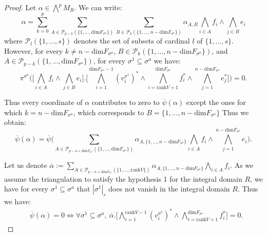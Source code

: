 \documentclass[10pt,a4paper]{amsart}
\begin{document}
\begin{proof}
    Let $\alpha \in \bigwedge^p M_R$. We can write:
    \begin{equation*}
        \alpha = \sum_{k=0}^p\sum_{A \in \mathcal{P}_{p-k}(\{1,...,\mathrm{dim}F_{\sigma^a}\})}\sum_{B \in \mathcal{P}_{k}(\{1,...,n-\mathrm{dim} F_{\sigma^a}\})}\alpha_{A,B} \bigwedge_{i \in A}f_i \wedge\bigwedge_{j\in B} e_i
    \end{equation*}
    where $\mathcal{P}_l(\{1,...,s\})$ denotes the set of subsets of cardinal $l$ of $\{1,...,s\}$. However, for every $k\neq n- \mathrm{dim} F_{\sigma^a}$, $B \in \mathcal{P}_{k}(\{1,...,n-\mathrm{dim} F_{\sigma^a}\})$, and $A \in \mathcal{P}_{p-k}(\{1,...,\mathrm{dim}F_{\sigma^a}\})$, for every $\sigma^1 \subseteq \sigma^a$ we have:
    \begin{equation*}
        \pi^{\sigma^a}\Bigg(\Bigg[\bigwedge_{i \in A}f_i \wedge\bigwedge_{j\in B} e_i \Bigg].\Bigg[\bigwedge_{i=1}^{\mathrm{dim}F_{\sigma^a} -1}(v_i^{\sigma^1})^* \wedge\bigwedge_{i=\mathrm{rank}V+1}^{\mathrm{dim}F_{\sigma^a}}f_i^* \wedge\bigwedge_{j=1}^{n-\mathrm{dim}F_{\sigma^a}}e_j^* \Bigg] \Bigg) = 0.
    \end{equation*}

    Thus every coordinate of $\alpha$ contributes to zero to $\overline{\psi}(\alpha)$ except the ones for which $k=n-\mathrm{dim}F_{\sigma^a}$, which corresponds to $B=\{1,...,n-\mathrm{dim}F_{\sigma^a}\}$ Thus we obtain:
    \begin{equation*}
        \overline{\psi}(\alpha) = \overline{\psi} \Bigg( \sum_{A \in \mathcal{P}_{p-n+\mathrm{dim} F_{\sigma^a}}(\{1,...,\mathrm{dim}F_{\sigma^a}\})}\alpha_{A,\{1,...,n-\mathrm{dim} F_{\sigma^a}\} } \bigwedge_{i \in A}f_i \wedge\bigwedge_{j=1}^{n-\mathrm{dim} F_{\sigma^a}} e_i\Bigg).
    \end{equation*}

    Let us denote $\overline{\alpha}:=\sum_{A \in \mathcal{P}_{p-n+\mathrm{dim} F_{\sigma^a}}(\{1,...,\mathrm{rank}V\})}\alpha_{A,\{1,...,n-\mathrm{dim} F_{\sigma^a}\} } \bigwedge_{i \in A}f_i$. As we assume the triangulation to satisfy the hypothesis 1 for the integral domain $R$, we have for every $\sigma^1 \subseteq \sigma^a$ that $|\sigma^1|_r$ does not vanish in the integral domain $R$. Thus we have:
    \begin{align*}
        &\overline{\psi}(\alpha) = 0 \iff \forall \sigma^1 \subseteq \sigma^a, ~\overline{\alpha}.\Bigg[\bigwedge_{i=1}^{\mathrm{rank}V -1}(v_i^{\sigma^1})^*\wedge\bigwedge_{i=\mathrm{rank}V+1}^{\mathrm{dim}F_{\sigma^a}} f_i^*\Bigg] =0.
    \end{align*}


\end{proof}
\end{document}
